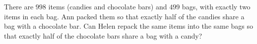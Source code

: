 There are $998$ items (candies and chocolate bars) and $499$ bags, with exactly two items in each bag. Ann packed them so that exactly half of the candies share a bag with a chocolate bar. Can Helen repack the same items into the same bags so that exactly half of the chocolate bars share a bag with a candy?
